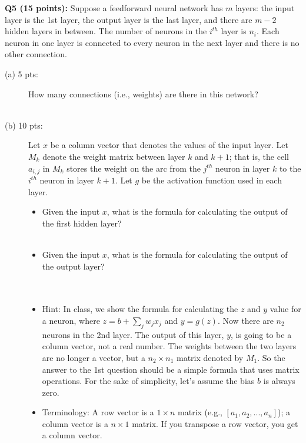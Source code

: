 \documentclass[11pt]{article}
\begin{document}
\vspace{0.4in}
\hspace{-0.3in}
{\bf Q5 (15 points):} Suppose a feedforward neural network has
  $m$ layers: the input layer is the 1st layer, the output layer
  is the last layer, and there are $m-2$ hidden layers in between. 
  The number of neurons in the $i^{th}$ layer is $n_i$.
  Each neuron in one layer is connected to
  every neuron in the next layer and there is no other connection.
\begin{description}
\item [(a) 5 pts:] How many connections (i.e., weights) are there in
                   this network? \\ \\

\item [(b) 10 pts:] Let $x$ be a column vector that denotes the values of the
  input layer. Let $M_k$ denote the weight matrix
  between layer $k$ and $k+1$; that is, the cell $a_{i,j}$
  in $M_k$ stores
  the weight on the arc from the $j^{th}$ neuron in layer $k$
  to the $i^{th}$ neuron in layer $k+1$. Let $g$ be the activation function used
  in each layer.
  \begin{itemize}
    \item Given the input $x$, what is the formula for calculating
      the output of the first hidden layer?  \\ \\

    \item Given the input $x$, what is the formula for calculating
      the output of the output layer? \\ \\ \\
        
    \item Hint: In class, we show the formula for calculating the $z$ and $y$
          value for a neuron, where $z = b + \sum_j w_j x_j$ and $y=g(z)$.
          Now there are $n_2$ neurons in the 2nd layer.
          The output of this layer, $y$,
          is going to be a column vector, not a real number. The weights between
          the two layers are no longer a vector,
          but a $n_2 \times n_1$ matrix denoted by $M_1$. So the answer
          to the 1st question should be a simple formula
          that uses matrix operations. For the sake of simplicity, let's assume
          the bias $b$ is always zero.
        \item Terminology: A row vector is a $1 \times n$ matrix
          (e.g., $[a_1, a_2, ..., a_n]$); a column vector is
          a $n \times 1$ matrix. If you transpose a row vector, you get a
          column vector.
   \end{itemize}

\end{description}  
\end{document}
